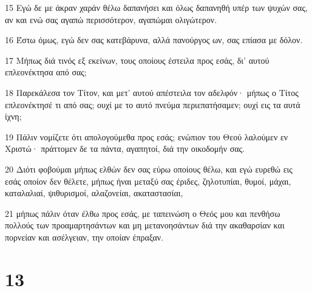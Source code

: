 \par 15 Εγώ δε με άκραν χαράν θέλω δαπανήσει και όλως δαπανηθή υπέρ των ψυχών σας, αν και ενώ σας αγαπώ περισσότερον, αγαπώμαι ολιγώτερον.
\par 16 Έστω όμως, εγώ δεν σας κατεβάρυνα, αλλά πανούργος ων, σας επίασα με δόλον.
\par 17 Μήπως διά τινός εξ εκείνων, τους οποίους έστειλα προς εσάς, δι' αυτού επλεονέκτησα από σας;
\par 18 Παρεκάλεσα τον Τίτον, και μετ' αυτού απέστειλα τον αδελφόν· μήπως ο Τίτος επλεονέκτησέ τι από σας; ουχί με το αυτό πνεύμα περιεπατήσαμεν; ουχί εις τα αυτά ίχνη;
\par 19 Πάλιν νομίζετε ότι απολογούμεθα προς εσάς; ενώπιον του Θεού λαλούμεν εν Χριστώ· πράττομεν δε τα πάντα, αγαπητοί, διά την οικοδομήν σας.
\par 20 Διότι φοβούμαι μήπως ελθών δεν σας εύρω οποίους θέλω, και εγώ ευρεθώ εις εσάς οποίον δεν θέλετε, μήπως ήναι μεταξύ σας έριδες, ζηλοτυπίαι, θυμοί, μάχαι, καταλαλιαί, ψιθυρισμοί, αλαζονείαι, ακαταστασίαι,
\par 21 μήπως πάλιν όταν έλθω προς εσάς, με ταπεινώση ο Θεός μου και πενθήσω πολλούς των προαμαρτησάντων και μη μετανοησάντων διά την ακαθαρσίαν και πορνείαν και ασέλγειαν, την οποίαν έπραξαν.

\chapter{13}

